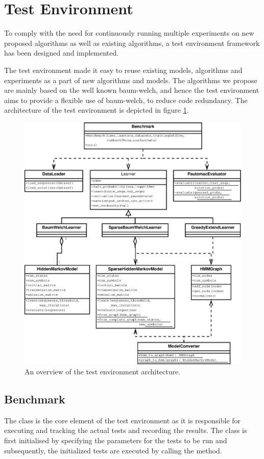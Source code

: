 \section{Test Environment}
\label{sec:testenv}
To comply with the need for continuously running multiple experiments on new proposed algorithms as well as existing algorithms, a test environment framework has been designed and implemented.

The test environment made it easy to reuse existing models, algorithms and experiments as a part of new algorithms and models. 
The algorithms we propose are mainly based on the well known \gls{baum-welch}, and hence the test environment aims to provide a flexible use of \gls{baum-welch}, to reduce code redundancy.
The architecture of the test environment is depicted in figure \ref{fig:testenvironment}.

\begin{figure}[!htb]
\centering
\includegraphics[scale=.4]{pictures/test-environment-overview.eps}
\caption{An overview of the test environment architecture.}
\label{fig:testenvironment}
\end{figure}

\subsection{Benchmark}
The  class is the core element of the test environment as it is responsible for executing and tracking the actual tests and recording the results. The  class is first initialised by specifying the parameters for the tests to be run and subsequently, the initialized tests are executed by calling the  method.

